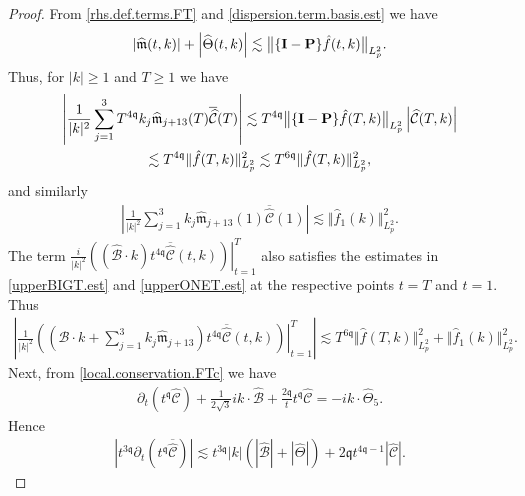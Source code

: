 \documentclass[10pt,a4paper]{amsart}
\newcommand{\highG}{\Theta}
\newcommand{\micro}{{\bf \{I- P\}}}
\def\norm#1{\big\Vert#1\big\Vert}
\newcommand{\pv}{p}
\newcommand{\qq}{\mathfrak{q}}
\newcommand{\tTq}{t^{3\qq}}
\newcommand{\tq}{t^{\qq}}
\begin{document}
\begin{proof}
From \eqref{rhs.def.terms.FT} and \eqref{dispersion.term.basis.est} we have 
\begin{align}\label{mTH.est}
\left| \widehat{\mathfrak{m}}(t,k)\right|
+
\left| \widehat{\highG}(t,k)\right|
 \lesssim 
\norm{\micro \hat{f}(t,k)}_{L^2_{\pv}}.
\end{align}
Thus, for $|k|\ge 1$ and $T \ge 1$ we have 
\begin{multline}\label{upperBIGT.est}
    \left| \frac{1}{|k|^2} \sum_{j=1}^3 
 T^{4\qq}  k_j\widehat{\mathfrak{m}}_{j+13} (T) \overline{\widehat{\mathcal{C}}}(T)\right|
 \lesssim  
 T^{4\qq}\norm{\micro \hat{f}(T,k)}_{L^2_{\pv}} \left|\widehat{\mathcal{C}}(T,k)\right|
 \\
  \lesssim  
 T^{4\qq}\Vert \hat{f}(T,k)\Vert_{L^2_{\pv}}^2
   \lesssim 
 T^{6\qq}\Vert \hat{f}(T,k)\Vert_{L^2_{\pv}}^2,
\end{multline}
and similarly 
\begin{align}\label{upperONET.est}
    \left| \frac{1}{|k|^2} \sum_{j=1}^3 
   k_j\widehat{\mathfrak{m}}_{j+13} (1) \overline{\widehat{\mathcal{C}}}(1)\right|
 \lesssim  
\norm{ \hat{f}_1(k)}_{L^2_{\pv}}^2.
\end{align}
The term  
$\left. \frac{i}{|k|^2} \left( \left( \widehat{\mathcal{B}}\cdot k  \right)t^{4\qq}\overline{\widehat{\mathcal{C}}}(t,k) \right)\right|_{t=1}^T$ also satisfies the estimates in \eqref{upperBIGT.est} and \eqref{upperONET.est} at the respective points $t=T$ and $t=1$.  Thus 
\begin{align*}
    \left|
\left. \frac{1}{|k|^2} \left( \left( \widehat{\mathcal{B}}\cdot k +\sum_{j=1}^3 k_j   \widehat{\mathfrak{m}}_{j+13} \right)t^{4\qq}\overline{\widehat{\mathcal{C}}}(t,k) \right)\right|_{t=1}^T
\right|
\lesssim
 T^{6\qq}\Vert \hat{f}(T,k)\Vert_{L^2_{\pv}}^2
 +
 \norm{ \hat{f}_1(k)}_{L^2_{\pv}}^2.
\end{align*}
Next, from \eqref{local.conservation.FTc} we have
\begin{align*}
    \partial_t\left( \tq \widehat{\mathcal{C}} \right)
  +
\frac{1}{2\sqrt{3}}   ik \cdot \widehat{\mathcal{B}}
+
\frac{2\qq }{t} \tq\widehat{\mathcal{C}}
=- ik \cdot \widehat{\highG}_{5}.
\end{align*}
Hence
\begin{align}\label{usingqleq1}
  \left|  \tTq \partial_t\left(\tq\overline{\widehat{\mathcal{C}}}\right) \right|
 \lesssim 
\tTq |k| \left( \left|\widehat{\mathcal{B}}\right|+\left| \widehat{\highG}\right| \right)
+
2\qq  t^{4\qq -1}\left|\widehat{\mathcal{C}}\right|.
\end{align}

\end{proof}
\end{document}
